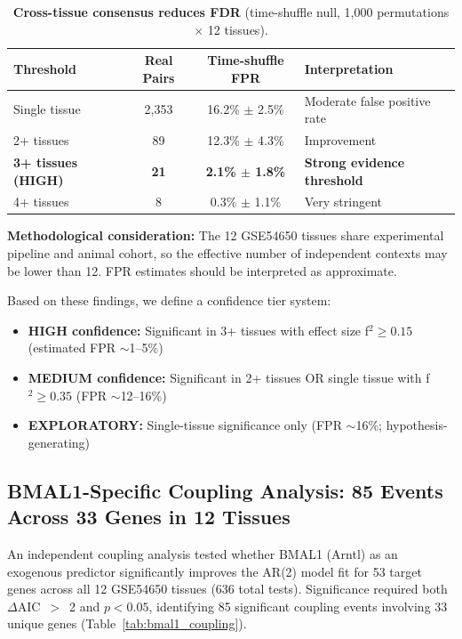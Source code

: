 \documentclass[11pt,a4paper]{article}
\begin{document}
\begin{table}[H]
\centering
\caption{\textbf{Cross-tissue consensus reduces FDR} (time-shuffle null, 1,000 permutations $\times$ 12 tissues).}
\label{tab:cross_tissue_fdr}
\begin{tabular}{lccl}
\toprule
Threshold & Real Pairs & Time-shuffle FPR & Interpretation \\
\midrule
Single tissue & 2,353 & 16.2\% $\pm$ 2.5\% & Moderate false positive rate \\
2+ tissues & 89 & 12.3\% $\pm$ 4.3\% & Improvement \\
\textbf{3+ tissues (HIGH)} & \textbf{21} & \textbf{2.1\% $\pm$ 1.8\%} & \textbf{Strong evidence threshold} \\
4+ tissues & 8 & 0.3\% $\pm$ 1.1\% & Very stringent \\
\bottomrule
\end{tabular}
\end{table}

\textbf{Methodological consideration:} The 12 GSE54650 tissues share experimental pipeline and animal cohort, so the effective number of independent contexts may be lower than 12. FPR estimates should be interpreted as approximate.

Based on these findings, we define a confidence tier system:
\begin{itemize}
    \item \textbf{HIGH confidence:} Significant in 3+ tissues with effect size f$^2 \geq 0.15$ (estimated FPR $\sim$1--5\%)
    \item \textbf{MEDIUM confidence:} Significant in 2+ tissues OR single tissue with f$^2 \geq 0.35$ (FPR $\sim$12--16\%)
    \item \textbf{EXPLORATORY:} Single-tissue significance only (FPR $\sim$16\%; hypothesis-generating)
\end{itemize}

\subsection{BMAL1-Specific Coupling Analysis: 85 Events Across 33 Genes in 12 Tissues}

An independent coupling analysis tested whether BMAL1 (Arntl) as an exogenous predictor significantly improves the AR(2) model fit for 53 target genes across all 12 GSE54650 tissues (636 total tests). Significance required both $\Delta$AIC~$>$~2 and $p < 0.05$, identifying 85 significant coupling events involving 33 unique genes (Table~\ref{tab:bmal1_coupling}).
\end{document}
